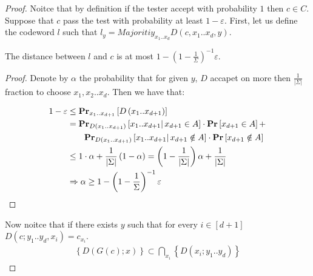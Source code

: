 \begin{proof}
  Noitce that by definition if the tester accept with probability $1$ then $c \in C$. Suppose that $c$ pass the test with probability at least $1 - \varepsilon$. First, let us define the codeword $l$ such that $ l_{y} = Majoritiy_{x_1 .. x_{d}}D\left(c, x_{1}.. x_{d},y\right)$.

  \begin{claim} 
    The distance between $l$ and $c$ is at most $ 1- \left( 1 - \frac{1}{\Sigma} \right)^{-1}\varepsilon$.  
  \end{claim}
  \begin{proof} 
    Denote by $\alpha$ the probability that for given $y$, $D$ accapet on more then $\frac{1}{|\Sigma|}$ fraction to choose $x_{1},x_{2}..x_{d}$. 
    Then we have that:  
    
    \begin{equation*}
      \begin{split}
        1 - \varepsilon  & \le \prbm{ D\left( x_1 .. x_{d+1} \right) }{x_1 .. x_{d+1}}  \\
        & = \prbcprb{  D\left( x_1 .. x_{d+1} \right)}{ x_1 .. x_{d+1}  }{ x_{d+1} \in A } + \\
        & \ \ \ \ \ \ \prbcprb{ D\left( x_1 .. x_{d+1} \right)}{ x_1 .. x_{d+1}   }{ x_{d+1} \notin A } \\
        & \le 1 \cdot \alpha +  \frac{1}{|\Sigma|}  \left( 1 - \alpha \right) = \left( 1 - \frac{1}{|\Sigma|} \right) \alpha  + \frac{1}{|\Sigma|} \\
       & \Rightarrow \alpha \ge  1- \left( 1 - \frac{1}{\Sigma} \right)^{-1}\varepsilon
      \end{split}
    \end{equation*}
  \end{proof} 

  Now noitce that if there exists $y$ such that for every $i \in [d+1]$ $D\left(c; y_{1} .. y_{d}, x_{i} \right) = c_{x_{i}}$. 
  \begin{equation*}
    \begin{split}
      \left\{ D(G(c) ; x ) \right\} \subset \bigcap_{ x_{i} } \left\{ D\left( x_{i} ; y_{1} .. y_{d} \right)  \right\} 
    \end{split}
  \end{equation*}
\end{proof}


